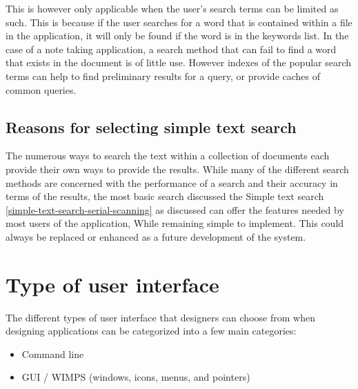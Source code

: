 This is however only applicable when the user's search terms can be limited as
such. This is because if the user searches for a word that is contained within a
file in the application, it will only be found if the word is in the keywords
list. In the case of a note taking application, a search method that can fail to
find a word that exists in the  document is of little use. However indexes of
the popular search terms can help to find preliminary results for a query, or
provide caches of common queries.




\subsection{Reasons for selecting simple text
search}\label{reasons-for-selecting-simple-text-search}

The numerous ways to search the text within a collection of documents each
provide their own ways to provide the results. While many of the different
search methods are concerned with the performance of a search and their accuracy
in terms of the results, the most basic search discussed the Simple text search
\ref{simple-text-search-serial-scanning} as discussed can offer the features
needed by most users of the application, While remaining simple to implement.
This could always be replaced or enhanced as a future development of the
system.

\section{Type of user interface}\label{type-of-user-interface}

The different types of user interface that designers can choose from
when designing applications can be categorized into a few main
categories:

\begin{itemize}
  \item Command line
  \item GUI / WIMPS (windows, icons, menus, and pointers)
\end{itemize}


